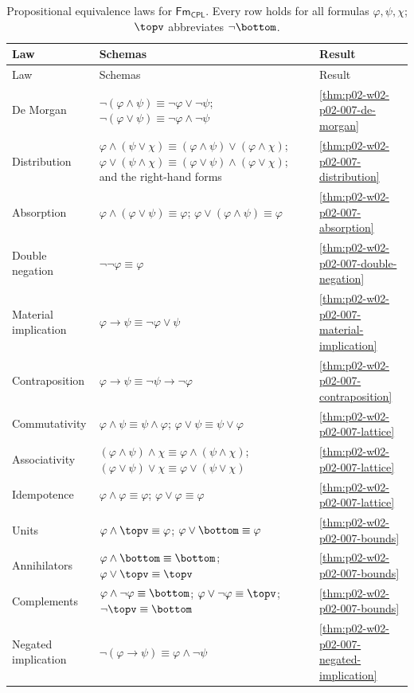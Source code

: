 \begingroup\small
\begin{longtable}{@{}p{}p{}p{}@{}}
\caption{Propositional equivalence laws for \(\mathsf{Fm}_{\mathsf{CPL}}\).
Every row holds for all formulas \(\varphi,\psi,\chi\); \(\topv\) abbreviates
\(\neg\bottom\).}
\label{tab:p02-w02-p02-007-equivalence-laws}\\
\toprule Law & Schemas & Result \\
\midrule\endfirsthead
\toprule Law & Schemas & Result \\
\midrule\endhead
De Morgan &
 \(\neg(\varphi\land\psi)\equiv\neg\varphi\lor\neg\psi\);
 \(\neg(\varphi\lor\psi)\equiv\neg\varphi\land\neg\psi\) &
 \cref{thm:p02-w02-p02-007-de-morgan} \\
Distribution &
 \(\varphi\land(\psi\lor\chi)\equiv(\varphi\land\psi)\lor(\varphi\land\chi)\);
 \(\varphi\lor(\psi\land\chi)\equiv(\varphi\lor\psi)\land(\varphi\lor\chi)\);
 and the right-hand forms &
 \cref{thm:p02-w02-p02-007-distribution} \\
Absorption &
 \(\varphi\land(\varphi\lor\psi)\equiv\varphi\);
 \(\varphi\lor(\varphi\land\psi)\equiv\varphi\) &
 \cref{thm:p02-w02-p02-007-absorption} \\
Double negation &
 \(\neg\neg\varphi\equiv\varphi\) &
 \cref{thm:p02-w02-p02-007-double-negation} \\
Material implication &
 \(\varphi\to\psi\equiv\neg\varphi\lor\psi\) &
 \cref{thm:p02-w02-p02-007-material-implication} \\
Contraposition &
 \(\varphi\to\psi\equiv\neg\psi\to\neg\varphi\) &
 \cref{thm:p02-w02-p02-007-contraposition} \\
Commutativity &
 \(\varphi\land\psi\equiv\psi\land\varphi\);
 \(\varphi\lor\psi\equiv\psi\lor\varphi\) &
 \cref{thm:p02-w02-p02-007-lattice} \\
Associativity &
 \((\varphi\land\psi)\land\chi\equiv\varphi\land(\psi\land\chi)\);
 \((\varphi\lor\psi)\lor\chi\equiv\varphi\lor(\psi\lor\chi)\) &
 \cref{thm:p02-w02-p02-007-lattice} \\
Idempotence &
 \(\varphi\land\varphi\equiv\varphi\); \(\varphi\lor\varphi\equiv\varphi\) &
 \cref{thm:p02-w02-p02-007-lattice} \\
Units &
 \(\varphi\land\topv\equiv\varphi\); \(\varphi\lor\bottom\equiv\varphi\) &
 \cref{thm:p02-w02-p02-007-bounds} \\
Annihilators &
 \(\varphi\land\bottom\equiv\bottom\); \(\varphi\lor\topv\equiv\topv\) &
 \cref{thm:p02-w02-p02-007-bounds} \\
Complements &
 \(\varphi\land\neg\varphi\equiv\bottom\);
 \(\varphi\lor\neg\varphi\equiv\topv\); \(\neg\topv\equiv\bottom\) &
 \cref{thm:p02-w02-p02-007-bounds} \\
Negated implication &
 \(\neg(\varphi\to\psi)\equiv\varphi\land\neg\psi\) &
 \cref{thm:p02-w02-p02-007-negated-implication} \\
\bottomrule
\end{longtable}
\endgroup

